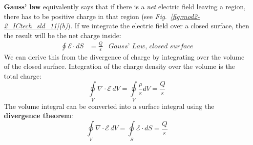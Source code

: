 \textbf{Gauss’ law} equivalently says that if there is a \textit{net} electric field leaving a region, there has to be positive charge in that region (see \emph{Fig.~\ref{fig:mod2-2_ICtech_sld_11}(b)}).  If we integrate the electric field over a closed surface, then the result will be the net charge inside:
    \begin{align}
    	\oint {\mathcal{E} \cdot dS} &= \frac{Q}{\varepsilon} &\textit{Gauss' Law, closed surface}
    \end{align}
We can derive this from the divergence of charge by integrating over the volume of the closed surface.  Integration of the charge density over the volume is the total charge:
    \begin{equation}
        \oint\limits_V {\nabla \cdot \mathcal{E}\,dV =} \oint\limits_V {\frac{\rho}{\varepsilon}dV = \frac{Q}{\varepsilon}} 
    \end{equation}
The volume integral can be converted into a surface integral using the \textbf{divergence theorem}:
    \begin{equation} 
        \oint\limits_V {\nabla \cdot \mathcal{E}\,dV = } \oint\limits_S {\mathcal{E} \cdot dS = } \frac{Q}{\varepsilon}
    \end{equation}
